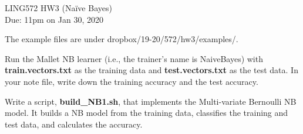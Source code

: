 \documentclass[11pt]{article}
\begin{document}
\begin{center}
\LARGE
LING572 HW3 (Na\"ive Bayes)\\
Due: 11pm on Jan 30, 2020\\
\vspace{0.3in}
\end{center}


The example files are under dropbox/19-20/572/hw3/examples/.

\vspace{0.3 in}
 Run the Mallet NB learner (i.e., the trainer's name
is NaiveBayes) with {\bf train.vectors.txt} as the training data 
and {\bf test.vectors.txt} as the test data.
In your note file, write down the training accuracy and the test accuracy.



\vspace{0.4 in}

 Write a script, {\bf build\_NB1.sh}, 
that implements the Multi-variate Bernoulli NB model. It builds a
NB model from the training data, classifies the training and test data, 
and calculates the accuracy. 
\end{document}

